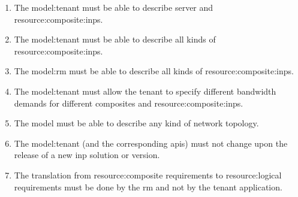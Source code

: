 \begin{enumerate}[
    label=\textbf{FR\arabic*},
    leftmargin=*,
    labelindent=1em
]
    \item \label{requirements:model:tenant:composites}
    The \gls{model:tenant} must be able to describe server and \glspl{resource:composite:inp}.
    
    \item \label{requirements:model:tenant:logical}
    The \gls{model:tenant} must be able to describe all kinds of \glspl{resource:composite:inp}.
    
    \item \label{requirements:model:rm:logical}
    The \gls{model:rm} must be able to describe all kinds of \glspl{resource:composite:inp}.

    \item \label{requirements:model:bandwidth}
    The \gls{model:tenant} must allow the tenant to specify different bandwidth demands for different composites and \glspl{resource:composite:inp}.
    
    \item \label{requirements:model:topology}
    The \gls{model} must be able to describe any kind of network topology.

    \item \label{requirements:model:invariance}
    The \gls{model:tenant} (and the corresponding \glspl{api}) must not change upon the release of a new \gls{inp} solution or version.
    
    \item \label{requirements:model:translation}
    The translation from \gls{resource:composite} requirements to \gls{resource:logical} requirements must be done by the \gls{rm} and not by the tenant application.
\end{enumerate}